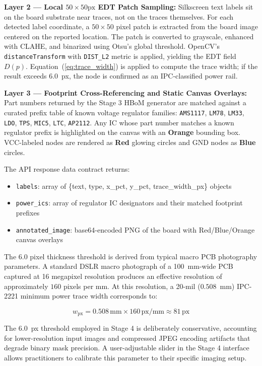 \documentclass[12pt,a4paper]{report}
\begin{document}
\textbf{Layer 2 --- Local $50 \times 50\text{px}$ EDT Patch Sampling:} Silkscreen text labels sit on the board substrate near traces, not on the traces themselves. For each detected label coordinate, a $50 \times 50$ pixel patch is extracted from the board image centered on the reported location. The patch is converted to grayscale, enhanced with CLAHE, and binarized using Otsu's global threshold. OpenCV's \texttt{distanceTransform} with \texttt{DIST\_L2} metric is applied, yielding the EDT field $D(p)$. Equation~(\ref{eq:trace_width}) is applied to compute the trace width; if the result exceeds 6.0~px, the node is confirmed as an IPC-classified power rail.

\textbf{Layer 3 --- Footprint Cross-Referencing and Static Canvas Overlays:} Part numbers returned by the Stage 3 HBoM generator are matched against a curated prefix table of known voltage regulator families: \texttt{AMS1117}, \texttt{LM78}, \texttt{LM33}, \texttt{LDO}, \texttt{TPS}, \texttt{MIC5}, \texttt{LTC}, \texttt{AP2112}. Any IC whose part number matches a known regulator prefix is highlighted on the canvas with an \textbf{Orange} bounding box. VCC-labeled nodes are rendered as \textbf{Red} glowing circles and GND nodes as \textbf{Blue} circles.

The API response data contract returns:
\begin{itemize}
  \item \texttt{labels}: array of \{text, type, x\_pct, y\_pct, trace\_width\_px\} objects
  \item \texttt{power\_ics}: array of regulator IC designators and their matched footprint prefixes
  \item \texttt{annotated\_image}: base64-encoded PNG of the board with Red/Blue/Orange canvas overlays
\end{itemize}

The 6.0 pixel thickness threshold is derived from typical macro PCB photography parameters. A standard DSLR macro photograph of a 100~mm-wide PCB captured at 16 megapixel resolution produces an effective resolution of approximately $160$ pixels per mm. At this resolution, a 20-mil ($0.508$~mm) IPC-2221 minimum power trace width corresponds to:

\begin{equation}
\label{eq:px_threshold}
w_{\text{px}} = 0.508\,\text{mm} \times 160\,\text{px/mm} \approx 81\,\text{px}
\end{equation}

The 6.0~px threshold employed in Stage 4 is deliberately conservative, accounting for lower-resolution input images and compressed JPEG encoding artifacts that degrade binary mask precision. A user-adjustable slider in the Stage 4 interface allows practitioners to calibrate this parameter to their specific imaging setup.
\end{document}
